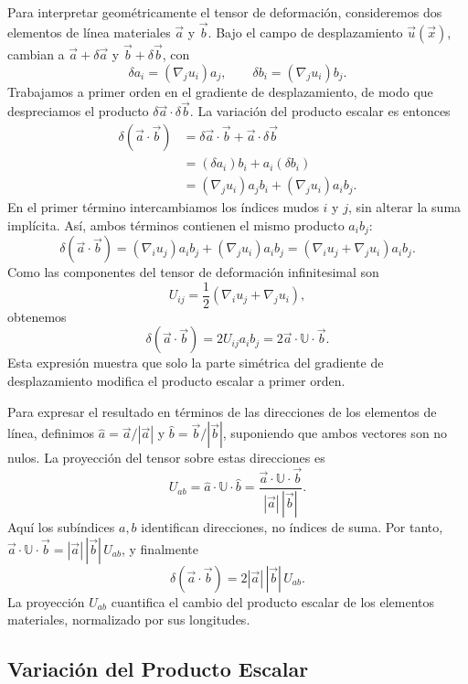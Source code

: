 Para interpretar geométricamente el tensor de deformación, consideremos dos elementos de línea materiales $\vec a$ y $\vec b$. Bajo el campo de desplazamiento $\vec u(\vec x)$, cambian a $\vec a+\delta\vec a$ y $\vec b+\delta\vec b$, con
\[
\delta a_i=(\nabla_j u_i)a_j,
\qquad
\delta b_i=(\nabla_j u_i)b_j.
\]
Trabajamos a primer orden en el gradiente de desplazamiento, de modo que despreciamos el producto $\delta\vec a\cdot\delta\vec b$. La variación del producto escalar es entonces
\[
\begin{aligned}
\delta(\vec a\cdot\vec b)
&=\delta\vec a\cdot\vec b+\vec a\cdot\delta\vec b\\
&=(\delta a_i)b_i+a_i(\delta b_i)\\
&=(\nabla_j u_i)a_jb_i+(\nabla_j u_i)a_ib_j.
\end{aligned}
\]
En el primer término intercambiamos los índices mudos $i$ y $j$, sin alterar la suma implícita. Así, ambos términos contienen el mismo producto $a_i b_j$:
\[
\delta(\vec a\cdot\vec b)
=(\nabla_i u_j)a_ib_j+(\nabla_j u_i)a_ib_j
=(\nabla_i u_j+\nabla_j u_i)a_ib_j.
\]
Como las componentes del tensor de deformación infinitesimal son
\[
U_{ij}=\frac{1}{2}(\nabla_i u_j+\nabla_j u_i),
\]
obtenemos
\[
\delta(\vec a\cdot\vec b)
=2U_{ij}a_ib_j
=2\vec a\cdot\mathbb U\cdot\vec b.
\]
Esta expresión muestra que solo la parte simétrica del gradiente de desplazamiento modifica el producto escalar a primer orden.

Para expresar el resultado en términos de las direcciones de los elementos de línea, definimos $\hat a=\vec a/|\vec a|$ y $\hat b=\vec b/|\vec b|$, suponiendo que ambos vectores son no nulos. La proyección del tensor sobre estas direcciones es
\[
U_{ab}=\hat a\cdot\mathbb U\cdot\hat b
=\frac{\vec a\cdot\mathbb U\cdot\vec b}{|\vec a|\,|\vec b|}.
\]
Aquí los subíndices $a,b$ identifican direcciones, no índices de suma. Por tanto, $\vec a\cdot\mathbb U\cdot\vec b=|\vec a|\,|\vec b|\,U_{ab}$, y finalmente
\[
\boxed{\delta(\vec a\cdot\vec b)=2|\vec a|\,|\vec b|\,U_{ab}}.
\]
La proyección $U_{ab}$ cuantifica el cambio del producto escalar de los elementos materiales, normalizado por sus longitudes.

\subsection{Variación del Producto Escalar}

